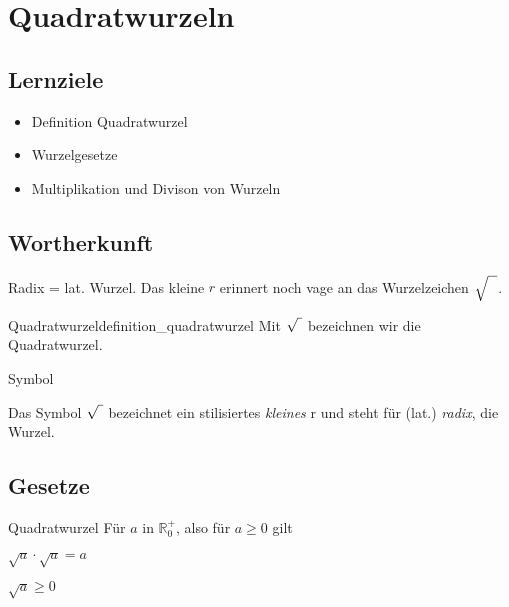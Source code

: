 
\section{Quadratwurzeln}\index{$\sqrt{\mathstrut{}\,}$}

\subsection*{Lernziele}

\begin{itemize}
\item Definition Quadratwurzel
\item Wurzelgesetze
\item Multiplikation und Divison von Wurzeln
\end{itemize}



\noTRAINER{\vspace{35mm}}

\subsection{Wortherkunft}
Radix = lat. Wurzel.
Das kleine $r$ erinnert noch vage an das Wurzelzeichen $\sqrt{\strut{}\ \ }$.

\begin{definition}{Quadratwurzel}{definition_quadratwurzel}
Mit $\sqrt{\vphantom{b} \,\,}$ bezeichnen wir die
Quadratwurzel.
\end{definition}

\begin{bemerkung}{Symbol}{}
  
Das Symbol $\sqrt{\vphantom{b} \,\,}$
bezeichnet ein stilisiertes {\textit{kleines}} {\huge{r}} und steht für
  (lat.) \textit{radix}, die Wurzel.
\end{bemerkung}
\newpage

\subsection{Gesetze}

\begin{definition}{Quadratwurzel}{}
Für $a$ in $\mathbb{R}_0^{+}$, also für $a\ge 0$ gilt

$\sqrt{a} \cdot \sqrt{a} = a$

$\sqrt{a} \ge 0$
\end{definition}



